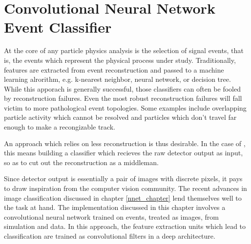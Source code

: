 \chapter{Convolutional Neural Network Event Classifier}
\label{cnn_chapter}

At the core of any particle physics analysis is the selection of signal events,
that is, the events which represent the physical process under study.
Traditionally, features are extracted from event reconstruction and passed
to a machine learning alrorithm, e.g. k-nearest neighbor, neural network, or
decision tree.
While this apporach is generally successful, those classifiers can often
be fooled by reconstruction failures.
Even the most robust reconstruction failures will fall victim to
more pathological event topologies.
Some examples include overlapping particle activity which cannot be resolved
and particles which don't travel far enough to make a recongizable track.

An approach which relies on less reconstruction is thus desirable.
In the case of \nova, this means building a classifier which recieves
the raw detector output as input, so as to cut out the reconstruction as a
middleman.

Since \nova detector output is essentially a pair of images with discrete
pixels, it pays to draw inspiration from the computer vision community.
The recent advances in image classification
\cite{krizhevsky2012imagenet,lecun2015deep,szegedy2014going}
discussed in chapter \ref{nnet_chapter} lend themselves well to the task at
hand.
The implementation discussed in this chapter involves a convolutional neural
network trained on events, treated as images, from \nova simulation and data.
In this approach, the feature extraction units which lead to classification
are trained as convolutional filters in a deep architecture.

